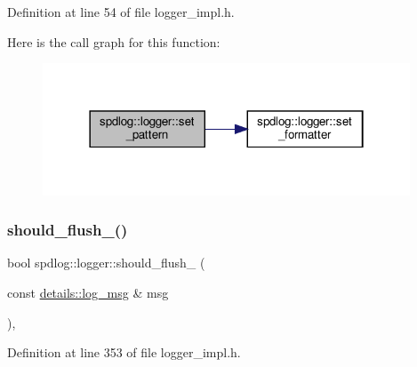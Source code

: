 Definition at line 54 of file logger\+\_\+impl.\+h.

Here is the call graph for this function\+:
\nopagebreak
\begin{figure}[H]
\begin{center}
\leavevmode
\includegraphics[width=310pt]{classspdlog_1_1logger_a0f61c15b955775652da9b2b813d9f3cd_cgraph}
\end{center}
\end{figure}
\mbox{\label{classspdlog_1_1logger_aa1bbe703cdeed2aef722a97a2bc1a800}} 
\subsubsection{\texorpdfstring{should\+\_\+flush\+\_\+()}{should\_flush\_()}}
{\footnotesize\ttfamily bool spdlog\+::logger\+::should\+\_\+flush\+\_\+ (\begin{DoxyParamCaption}\item[{const \hyperlink{structspdlog_1_1details_1_1log__msg}{details\+::log\+\_\+msg} \&}]{msg }\end{DoxyParamCaption})\hspace{0.3cm}{\ttfamily [inline]}, {\ttfamily [protected]}}



Definition at line 353 of file logger\+\_\+impl.\+h.

